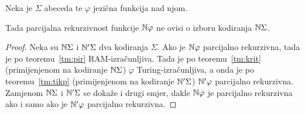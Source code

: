 \begin{korolar}[{name=[neovisnost izračunljivosti jezične funkcije o kodiranju abecede]}]\label{kor:ikojiNSigma}
Neka je $\Sigma$ abeceda te $\varphi$ jezična funkcija nad njom.

	Tada parcijalna rekurzivnost funkcije ${\mathbb N}\varphi$ ne ovisi o izboru kodiranja ${\mathbb N}\Sigma$.
\end{korolar}
\begin{proof}
Neka su ${\mathbb N}\Sigma$ i ${\mathbb N}'\Sigma$ dva kodiranja $\Sigma$. Ako je ${\mathbb N}\varphi$ parcijalno rekurzivna, tada je po teoremu~\ref{tm:pir} RAM-izračunljiva. Tada je po teoremu~\ref{tm:krit} (primijenjenom na kodiranje ${\mathbb N}\Sigma$) $\varphi$ Turing-izračunljiva, a onda je po teoremu~\ref{tm:tikp} (primijenjenom na kodiranje ${\mathbb N}'\Sigma$) ${\mathbb N}'\varphi$ parcijalno rekurzivna. Zamjenom ${\mathbb N}\Sigma$ i ${\mathbb N}'\Sigma$ se dokaže i drugi smjer, dakle ${\mathbb N}\varphi$ je parcijalno rekurzivna ako i samo ako je ${\mathbb N}'\varphi$ parcijalno rekurzivna.
\end{proof}


